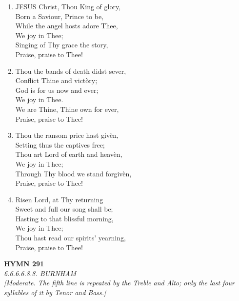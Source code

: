 \begin{enumerate}
    \item JESUS Christ, Thou King of glory, \\
        Born a Saviour, Prince to be, \\
        While the angel hosts adore Thee, \\
        We joy in Thee; \\
        Singing of Thy grace the story, \\
        Praise, praise to Thee!

    \item Thou the bands of death didst sever, \\
        Conflict Thine and vict\`ory; \\
        God is for us now and ever; \\
        We joy in Thee. \\
        We are Thine, Thine own for ever, \\
        Praise, praise to Thee!

    \item Thou the ransom price hast giv\`en, \\
        Setting thus the captives free; \\
        Thou art Lord of earth and heav\`en, \\
        We joy in Thee; \\
        Through Thy blood we stand forgiv\`en, \\
        Praise, praise to Thee!

    \item Risen Lord, at Thy returning \\
        Sweet and full our song shall be; \\
        Hasting to that blissful morning, \\
        We joy in Thee; \\
        Thou hast read our spirits' yearning, \\
        Praise, praise to Thee!

\end{enumerate}

\newpage
\begin{center}
    {\Large \textbf{HYMN 291}}
    \\
    \textit{6.6.6.6.8.8. BURNHAM}
    \\
    \textit{\small [Moderate. The fifth line is repeated by the Treble and Alto; only the last four syllables of it by Tenor and Bass.]}
\end{center}
\vspace{1em}

